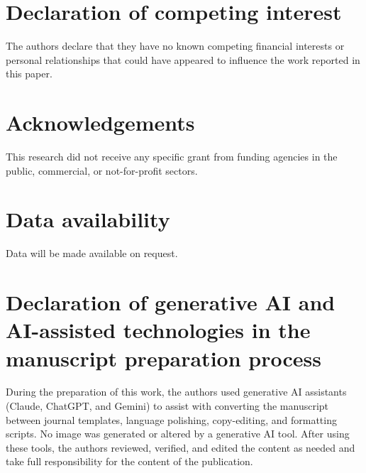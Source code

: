 \documentclass[a4paper,fleqn]{cas-sc}
\begin{document}
\section*{Declaration of competing interest}
The authors declare that they have no known competing financial interests or
personal relationships that could have appeared to influence the work reported
in this paper.

\section*{Acknowledgements}
This research did not receive any specific grant from funding agencies in the
public, commercial, or not-for-profit sectors.

\section*{Data availability}
Data will be made available on request.

\section*{Declaration of generative AI and AI-assisted technologies in the
manuscript preparation process}
During the preparation of this work, the authors used generative AI assistants
(Claude, ChatGPT, and Gemini) to assist with converting the manuscript between
journal templates, language polishing, copy-editing, and formatting scripts.
No image was generated or altered by a generative AI tool. After using these
tools, the authors reviewed, verified, and edited the content as needed and
take full responsibility for the content of the publication.



\end{document}
